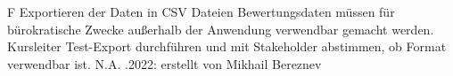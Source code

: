 \begin{myreq}
    \threeinline
    {\reqno}
    {\reqtype F}
    {}
    \reqdesc Exportieren der Daten in CSV Dateien
    \reqrat Bewertungsdaten müssen für bürokratische Zwecke außerhalb der Anwendung verwendbar gemacht werden.
    \reqorig Kursleiter
    \reqfit Test-Export durchführen und mit Stakeholder abstimmen, ob Format verwendbar ist.
    \twoinline
    {}
    {}
    \twoinline
    {}
    {\reqconf N.A.}
    \reqmater
    .2022: erstellt von Mikhail Bereznev
\end{myreq}